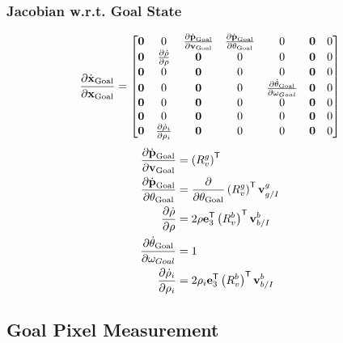 \subsubsection{Jacobian w.r.t. Goal State}
\begin{equation}
  \frac{\partial \dot{\boldsymbol{\mathrm{x}}}_{\text{Goal}}}{\partial \boldsymbol{\mathrm{x}}_{\text{Goal}}}
  =
  \begin{bmatrix}
    \boldsymbol{\mathrm{0}} & 0 & \frac{\partial \dot{\boldsymbol{\mathrm{p}}}_{\text{Goal}}}{\partial
      \boldsymbol{\mathrm{v}}_{\text{Goal}}} & \frac{\partial
      \dot{\boldsymbol{\mathrm{p}}}_{\text{Goal}}}{\partial \theta_{\text{Goal}}} & 0 & \boldsymbol{\mathrm{0}} & 0 \\
    \boldsymbol{\mathrm{0}} & \frac{\partial \dot{\rho}}{\partial \rho} & \boldsymbol{\mathrm{0}} & 0 & 0
             & \boldsymbol{\mathrm{0}} & 0 \\
    \boldsymbol{\mathrm{0}} & 0 & \boldsymbol{\mathrm{0}} & 0 & 0 & \boldsymbol{\mathrm{0}} & 0 \\
    \boldsymbol{\mathrm{0}} & 0 & \boldsymbol{\mathrm{0}} & 0 & \frac{\partial
      \dot{\theta}_{\text{Goal}}}{\partial \omega_{Goal}} & \boldsymbol{\mathrm{0}} & 0 \\
    \boldsymbol{\mathrm{0}} & 0 & \boldsymbol{\mathrm{0}} & 0 & 0 & \boldsymbol{\mathrm{0}} & 0 \\
    \boldsymbol{\mathrm{0}} & 0 & \boldsymbol{\mathrm{0}} & 0 & 0 & \boldsymbol{\mathrm{0}} & 0 \\
    \boldsymbol{\mathrm{0}} & \frac{\partial \dot{\rho}_i}{\partial \rho_i} & \boldsymbol{\mathrm{0}} & 0 & 0 & \boldsymbol{\mathrm{0}} & 0
  \end{bmatrix}
\end{equation}
\begin{align}
    \frac{\partial \dot{\boldsymbol{\mathrm{p}}}_{\text{Goal}}}{\partial
      \boldsymbol{\mathrm{v}}_{\text{Goal}}}
      &=
      \left(R_{v}^{g}\right)^{\mathsf{T}}
      \\
    \frac{\partial \dot{\boldsymbol{\mathrm{p}}}_{\text{Goal}}}{\partial \theta_{\text{Goal}}}
      &=
      \frac{\partial}{\partial \theta_{\text{Goal}}} \left(R_{v}^{g}\right)^{\mathsf{T}} \boldsymbol{\mathrm{v}}_{g/I}^{g}
      \\
    \frac{\partial \dot{\rho}}{\partial \rho}
      &=
      2 \rho \boldsymbol{\mathrm{e}}_{3}^{\mathsf{T}} \left(R_{v}^{b}\right)^{\mathsf{T}} \boldsymbol{\mathrm{v}}_{b/I}^{b}
      \\
    \frac{\partial \dot{\theta}_{\text{Goal}}}{\partial \omega_{Goal}}
      &=
      1
      \\
    \frac{\partial \dot{\rho}_i}{\partial \rho_i}
      &=
      2 \rho_i \boldsymbol{\mathrm{e}}_{3}^{\mathsf{T}} \left(R_{v}^{b}\right)^{\mathsf{T}} \boldsymbol{\mathrm{v}}_{b/I}^{b}
\end{align}

\subsection{Goal Pixel Measurement}
